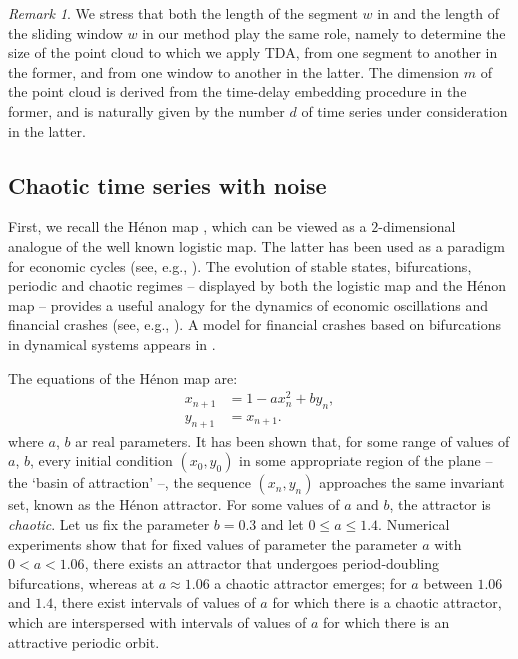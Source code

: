 \documentclass[preprint,12pt]{elsarticle}
\theoremstyle{definition}
\theoremstyle{remark}
\newtheorem{remark}[thm]{Remark}
\numberwithin{equation}{section}
\theoremstyle{definition}
\begin{document}
\begin{remark}
We stress that both the length of the segment  $w$ in \cite{Seversky16} and the length of the sliding window  $w$ in our method play the same role, namely to determine the size of the point cloud to which we apply TDA, from one segment to another in the former, and from one window to another in the latter. The dimension $m$ of the point cloud  is derived from the time-delay embedding procedure in the former, and is naturally given by the number $d$ of time series under consideration in the latter.
\end{remark}




\subsection{Chaotic time series with noise}
First, we recall the   H\'enon map   \cite{Henon}, which  can be viewed as a $2$-dimensional analogue of the well known logistic map. The latter has been used as a paradigm for economic cycles (see, e.g., \cite{Ausloos}). The evolution of stable states, bifurcations, periodic and chaotic regimes -- displayed by both the logistic map and the H\'enon map --  provides a useful analogy for the dynamics of economic oscillations and financial crashes (see, e.g., \cite{Sornette}).
A model for financial crashes based on bifurcations in dynamical systems appears in \cite{Douady}.

The equations of the H\'enon map are:
\begin{equation}\label{eqn:henon}\begin{split}x_{n+1} &= 1-a x_n^2+b y_n,\\
y_{n+1} &= x_{n+1}.
\end{split}\end{equation}
where $a$, $b$ ar real parameters. It has been shown that, for some range of values of $a$, $b$, every initial condition $(x_0,y_0)$ in some appropriate region of the plane -- the `basin of attraction' --, the sequence $(x_n,y_n)$ approaches the same invariant set, known as the H\'enon attractor. For some values of $a$ and $b$, the attractor is \emph{chaotic}.
Let us fix the parameter $b=0.3$ and let $0\leq a\leq 1.4$. Numerical experiments show that for fixed values of parameter the parameter $a$ with $0<a<1.06$, there exists an  attractor that undergoes period-doubling bifurcations, whereas at $a\approx 1.06$ a  chaotic attractor  emerges; for  $a$ between $1.06$ and $1.4$, there exist intervals of values of $a$ for  which  there is a chaotic attractor,  which are interspersed with intervals of values of $a$ for which there is an attractive periodic orbit.
\end{document}
